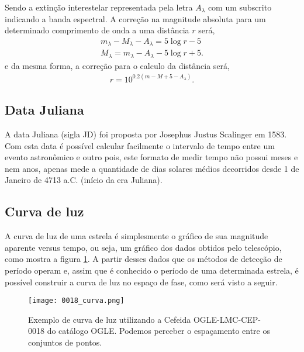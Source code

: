 Sendo a extinção interestelar representada pela letra $A_{\lambda}$ com um subscrito indicando a banda espectral. A correção na magnitude absoluta para um determinado comprimento de onda a uma distância $r$ será,
\begin{align}
m_{\lambda} - M_{\lambda} - A_{\lambda} = 5 \log r - 5 \\
M_{\lambda} = m_{\lambda} - A_{\lambda} - 5 \log r + 5.
\end{align} 
e da mesma forma, a correção para o calculo da distância será,
\begin{align}
r = 10^{0.2 \left(m -M + 5 - A_{\lambda} \right)}.
\end{align}


 
\subsection{Data Juliana}

A data Juliana (sigla JD) foi proposta por Josephus Justus Scalinger em 1583. Com esta data é possível calcular facilmente o intervalo de tempo entre um evento astronômico e outro pois, este formato de medir tempo não possui meses e nem anos, apenas mede a quantidade de dias solares médios decorridos desde 1 de Janeiro de 4713 a.C. (início da era Juliana).


\subsection{Curva de luz}

A curva de luz de uma estrela é simplesmente o gráfico de sua magnitude aparente versus tempo, ou seja, um gráfico dos dados obtidos pelo telescópio, como mostra a figura \ref{fig:curva_luz}. A partir desses dados que os métodos de detecção de período operam e, assim que é conhecido o período de uma determinada estrela, é possível construir a curva de luz no espaço de fase, como será visto a seguir.

\begin{figure}[h!]
\centering
\texttt{[image: 0018\_curva.png]}
\caption[Exemplo de curva de luz]{Exemplo de curva de luz utilizando a Cefeida OGLE-LMC-CEP-0018 do catálogo OGLE. Podemos perceber o espaçamento entre os conjuntos de pontos.}
\label{fig:curva_luz}
\end{figure}


